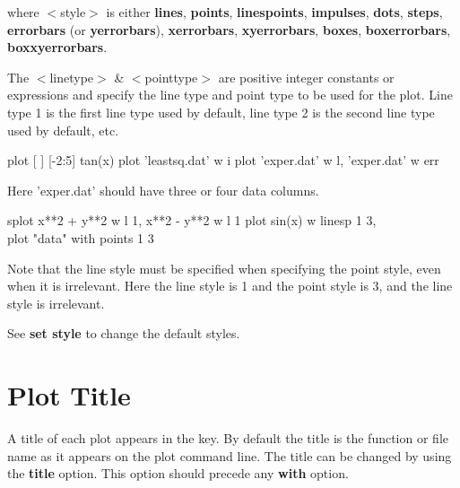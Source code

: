 
where $<$style$>$ is either {\bf lines}, {\bf points}, {\bf linespoints}, {\bf impulses},
{\bf dots}, {\bf steps}, {\bf errorbars} (or {\bf yerrorbars}), 
{\bf xerrorbars}, {\bf xyerrorbars}, {\bf boxes}, {\bf boxerrorbars},
{\bf boxxyerrorbars}.

The $<$linetype$>$ \& $<$pointtype$>$ are positive
integer constants or expressions and specify the line type and point
type to be used for the plot. Line type 1 is the first line type used
by default, line type 2 is the second line type used by default, etc.

        {plot [ ] [-2:5] tan(x)}
 {plot 'leastsq.dat' w i}
{plot 'exper.dat' w l, 'exper.dat' w err}

Here 'exper.dat' should have three or four data columns.

{splot x**2 + y**2 w l 1, x**2 - y**2 w l 1}
    {plot sin(x) w linesp 1 3, \\}
{plot "data" with points 1 3}

Note that the line style must be specified when specifying the point
style, even when it is irrelevant. Here the line style is 1 and the
point style is 3, and the line style is irrelevant.

See {\bf set style} to change the default styles.

\section{Plot Title}

A title of each plot appears in the key. By default the title is
the function or file name as it appears on the plot command line.
The title can be changed by using the {\bf title} option. This option
should precede any {\bf with} option.


